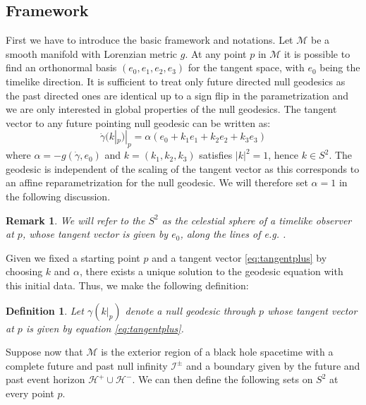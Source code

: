 \documentclass[reqno]{amsart}
\numberwithin{equation}{section}
\newcommand{\HH}{\mathcal H}
\newcommand{\scri}{\mathcal{I}}
\theoremstyle{plain}
\newtheorem{definition}[thm]{Definition}
\newtheorem{remark}[thm]{Remark}
\theoremstyle{definition}
\begin{document}
\subsection{Framework}
First we have to introduce the basic framework and notations. Let $\mathcal{M}$ be a smooth manifold with Lorenzian metric $g$. At any point $p$ in $\mathcal{M}$ it is possible to find an orthonormal basis $(e_0,e_1,e_2,e_3)$ for the tangent space, with $e_0$ being the timelike direction. It is sufficient to treat only future directed null geodesics as the past directed ones are identical up to a sign flip in the parametrization and we are only interested in global properties of the null geodesics. The tangent vector to any future pointing null geodesic can be written as:
\begin{equation}\label{eq:tangentplus}
\dot\gamma( k|_p)|_p =\alpha ( e_0+ k_1 e_1+ k_2 e_2+ k_3 e_3)
\end{equation} 
where $\alpha= -g(\dot\gamma,e_0)$ and $k =(k_1,k_2,k_3)$ satisfies $|k|^2 =1$, hence $k\in S^2$. The geodesic is independent of the scaling of the tangent vector as this corresponds to an affine reparametrization for the null geodesic. We will therefore set $\alpha=1$ in the following discussion. 
\begin{remark}We will refer to the $S^2$ as the celestial sphere of a timelike observer at $p$, whose tangent vector is given by $e_0$, along the lines of e.g. \cite[p.8]{penrose_spinors_1987}.\end{remark}
Given we fixed a starting point $p$ and a tangent vector \eqref{eq:tangentplus} by choosing $k$ and $\alpha$, there exists a unique solution to the geodesic equation with this initial data. Thus, we make the following definition:
\begin{definition}Let $\gamma (k|_p)$ denote a null geodesic through $p$ whose tangent vector at $p$ is given by equation \eqref{eq:tangentplus}.
\end{definition}
\noindent Suppose now that $\mathcal{M}$ is the exterior region of a black hole spacetime with a complete future and past null infinity $\scri^\pm$ and a boundary given by the future and past event horizon $\HH^+\cup\HH^-$. We can then define the following sets on $S^2$ at every point $p$.
\end{document}

